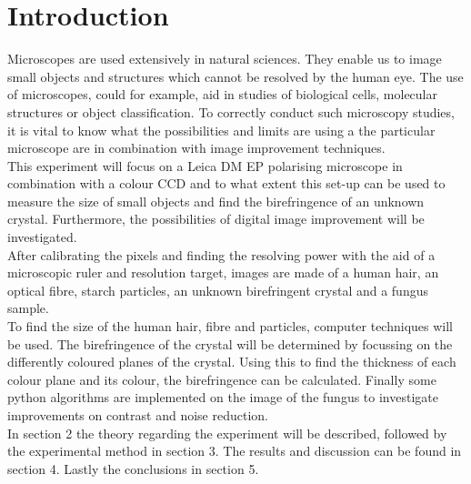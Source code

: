 \section{Introduction}
Microscopes are used extensively in natural sciences. They enable us to image small objects and structures which cannot be resolved by the human eye. The use of microscopes, could for example, aid in studies of biological cells, molecular structures or object classification. To correctly conduct such microscopy studies, it is vital to know what the possibilities and limits are using a the particular microscope are in combination with image improvement techniques.\\
This experiment will focus on a Leica DM EP polarising microscope in combination with a colour CCD and to what extent this set-up can be used to measure the size of small objects and find the birefringence of an unknown crystal. Furthermore, the possibilities of digital image improvement will be investigated.\\
After calibrating the pixels and finding the resolving power with the aid of a microscopic ruler and resolution target, images are made of a human hair, an optical fibre, starch particles, an unknown birefringent crystal and a fungus sample.\\
To find the size of the human hair, fibre and particles, computer techniques will be used. The birefringence of the crystal will be determined by focussing on the differently coloured planes of the crystal. Using this to find the thickness of each colour plane and its colour, the birefringence can be calculated. Finally some python algorithms are implemented on the image of the fungus to investigate improvements on contrast and noise reduction.\\
In section 2 the theory regarding the experiment will be described, followed by the experimental method in section 3. The results and discussion can be found in section 4. Lastly the conclusions in section 5.









\begin{comment}
    TheInleiding ( Introduction) describes:   -The  research  question.  (Be  as  precise  as  possible.  Not:  “We  investigate  on  which  parameters  the  bubble  behaviour  depends”,  but  “we  study  the  relationship  between  the  path  of  bubbles  at  a  microfluidic T-junction, and the velocity and length of those bubbles).\\-The relevance of the research question (for science and/or technology).\\-The state-of-art: what is already know? (including references to prior literature).\\-A brief description of the research method/approach.\\-A brief description of the structure/contents of the rest of the report.\\The  introduction  should  be  self-contained,  without  reference  to  the  manual  or  to  the  remainder  of  the  report, and should be understandable to readers who know nothing about the research.
\end{comment}